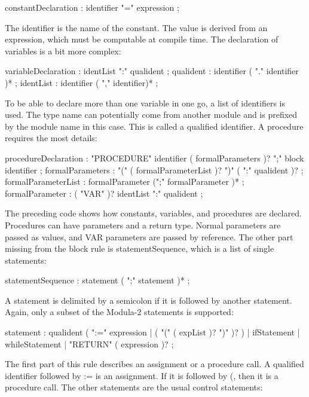 \begin{shell}
constantDeclaration : identifier "=" expression ;
\end{shell}

The identifier is the name of the constant. The value is derived from an expression, which must be computable at compile time. The declaration of variables is a bit more complex:

\begin{shell}
variableDeclaration : identList ":" qualident ;
qualident : identifier ( "." identifier )* ;
identList : identifier ( "," identifier)* ;
\end{shell}

To be able to declare more than one variable in one go, a list of identifiers is used. The type name can potentially come from another module and is prefixed by the module name in this case. This is called a qualified identifier. A procedure requires the most details:

\begin{shell}
procedureDeclaration
    : "PROCEDURE" identifier ( formalParameters )? ";"
        block identifier ;
formalParameters
    : "(" ( formalParameterList )? ")" ( ":" qualident )? ;
formalParameterList
    : formalParameter (";" formalParameter )* ;
formalParameter : ( "VAR" )? identList ":" qualident ;
\end{shell}

The preceding code shows how constants, variables, and procedures are declared. Procedures can have parameters and a return type. Normal parameters are passed as values, and VAR parameters are passed by reference. The other part missing from the block rule is statementSequence, which is a list of single statements:

\begin{shell}
statementSequence
    : statement ( ";" statement )* ;
\end{shell}

A statement is delimited by a semicolon if it is followed by another statement. Again, only a subset of the Modula-2 statements is supported:

\begin{shell}
statement
    : qualident ( ":=" expression | ( "(" ( expList )? ")" )? )
    | ifStatement | whileStatement | "RETURN" ( expression )? ;
\end{shell}

The first part of this rule describes an assignment or a procedure call. A qualified identifier followed by := is an assignment. If it is followed by (, then it is a procedure call. The other statements are the usual control statements:

